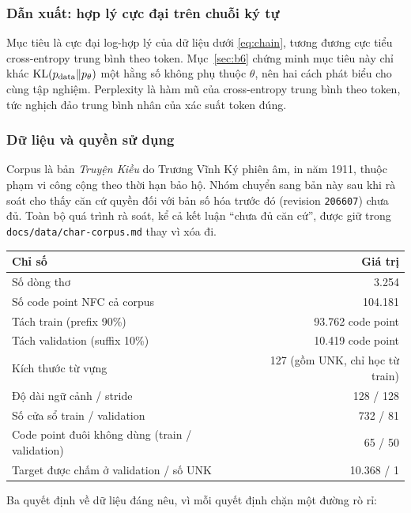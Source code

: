 \subsubsection{Dẫn xuất: hợp lý cực đại trên chuỗi ký tự}

Mục tiêu là cực đại log-hợp lý của dữ liệu dưới \eqref{eq:chain}, tương đương cực
tiểu cross-entropy trung bình theo token. Mục~\ref{sec:b6} chứng minh mục tiêu này
chỉ khác $\operatorname{KL}(p_{\mathrm{data}}\|p_\theta)$ một hằng số không phụ thuộc $\theta$, nên hai cách
phát biểu cho cùng tập nghiệm. Perplexity là hàm mũ của cross-entropy trung bình
theo token, tức nghịch đảo trung bình nhân của xác suất token đúng.

\subsubsection{Dữ liệu và quyền sử dụng}

Corpus là bản \emph{Truyện Kiều} do Trương Vĩnh Ký phiên âm, in năm 1911, thuộc
phạm vi công cộng theo thời hạn bảo hộ. Nhóm chuyển sang bản này sau khi rà soát
cho thấy căn cứ quyền đối với bản số hóa trước đó (revision \texttt{206607}) chưa
đủ. Toàn bộ quá trình rà soát, kể cả kết luận ``chưa đủ căn cứ'', được giữ trong
\texttt{docs/data/char-corpus.md} thay vì xóa đi.

\begin{center}
\begin{tabular}{lr}
\toprule
\textbf{Chỉ số} & \textbf{Giá trị}\\
\midrule
Số dòng thơ & 3.254\\
Số code point NFC cả corpus & 104.181\\
Tách train (prefix 90\%) & 93.762 code point\\
Tách validation (suffix 10\%) & 10.419 code point\\
Kích thước từ vựng & 127 (gồm UNK, chỉ học từ train)\\
Độ dài ngữ cảnh / stride & 128 / 128\\
Số cửa sổ train / validation & 732 / 81\\
Code point đuôi không dùng (train / validation) & 65 / 50\\
Target được chấm ở validation / số UNK & 10.368 / 1\\
\bottomrule
\end{tabular}
\end{center}

Ba quyết định về dữ liệu đáng nêu, vì mỗi quyết định chặn một đường rò rỉ:

